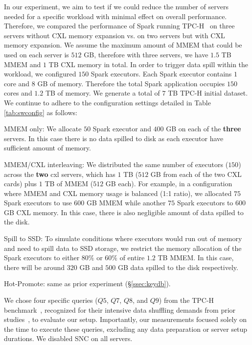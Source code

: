 In our experiment, we aim to test if we could reduce the number of servers needed for a specific workload with minimal effect on overall performance. Therefore, we compared the performance of Spark running TPC-H~\cite{tpch} on three servers without CXL memory expansion vs. on two servers but with CXL memory expansion. We assume the maximum amount of MMEM that could be used on each server is $512$ GB, therefore with three servers, we have $1.5$ TB MMEM and $1$ TB CXL memory in total.
In order to trigger data spill within the workload, we configured $150$ Spark executors. Each Spark executor contains $1$ core and $8$ GB of memory. Therefore the total Spark application occupies $150$ cores and $1.2$ TB of memory. We generate a total of $7$ TB TPC-H initial dataset. We continue to adhere to the configuration settings detailed in Table \ref{tab:swconfig} as follows:
\begin{icompact}
  \item MMEM only: We allocate $50$ Spark executor and $400$ GB on each of the \textbf{three} servers. In this case there is no data spilled to disk as each executor have sufficient amount of memory.
  \item MMEM/CXL interleaving: We distributed the same number of executors ($150$) across the \textbf{two} cxl servers, which has $1$ TB ($512$ GB from each of the two CXL cards) plus $1$ TB of MMEM ($512$ GB each). For example, in a configuration where MMEM and CXL memory usage is balanced (1:1 ratio), we allocated $75$ Spark executors to use $600$ GB MMEM while another $75$ Spark executors to $600$ GB CXL memory. In this case, there is also negligible amount of data spilled to the disk.
  \item Spill to SSD: To simulate conditions where executors would run out of memory and need to spill data to SSD storage, we restrict the memory allocation of the Spark executors to either $80\%$ or $60\%$ of entire $1.2$ TB MMEM. In this case, there will be around $320$ GB and $500$ GB data spilled to the disk respectively.
  \item Hot-Promote: same as prior experiment (\S\ref{ssec:keydb}).
\end{icompact}
We chose four specific queries ($Q5$, $Q7$, $Q8$, and $Q9$) from the TPC-H benchmark~\cite{tpch}, recognized for their intensive data shuffling demands from prior studies~\cite{PSACS}, to evaluate our setup. Importantly, our measurements focused solely on the time to execute these queries, excluding any data preparation or server setup durations. We disabled SNC on all servers.

